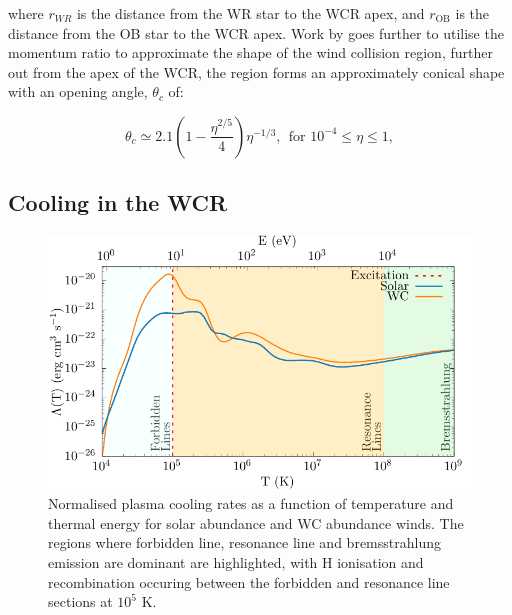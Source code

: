 where $r_{WR}$ is the distance from the WR star to the WCR apex, and $r_\text{OB}$ is the distance from the OB star to the WCR apex.
Work by \cite{eichler_particle_1993} goes further to utilise the momentum ratio to approximate the shape of the wind collision region, further out from the apex of the WCR, the region forms an approximately conical shape with an opening angle, $\theta_c$ of:

\begin{equation}
  \theta_c \simeq 2.1 \left(1 - \frac{\eta^{2/5}}{4}\right) \eta^{-1/3}, ~~ \text{for } 10^{-4} \leq \eta \leq 1, \label{eq:conic}
\end{equation}













\subsection{Cooling in the WCR}
\label{sec:wcrcooling}
\begin{figure}[h]
  \centering
  \includegraphics{assets/cooling-breakdown/cooling-curve-solar-withev.pdf}
  \caption[WC \& solar abundance plasma cooling curves]{Normalised plasma cooling rates as a function of temperature and thermal energy for solar abundance and WC abundance winds. The regions where forbidden line, resonance line and bremsstrahlung emission are dominant are highlighted, with H ionisation and recombination occuring between the forbidden and resonance line sections at $10^5$ \si{\kelvin}.}
  \label{fig:wcsolcooling}
\end{figure}

